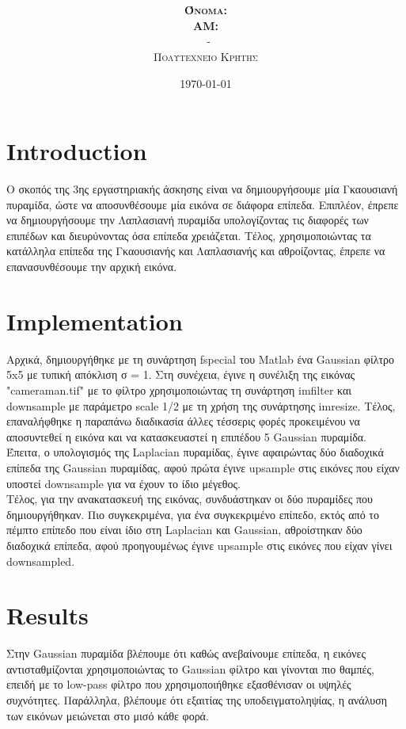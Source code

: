 \documentclass{article}
\title{\underline{\textbf{\assignmentNumber}}}
\author{\textsc{\textbf{Όνομα:}}  \studentName\\
		\textsc{\textbf{ΑΜ:}}  \studentNumber\\
		\course \ - \courseName\\ 
		\textsc{Πολυτεχνείο Κρήτης}
}
\date{\today}
\begin{document}
	\maketitle

\section*{Introduction}
	Ο σκοπός της 3ης εργαστηριακής άσκησης είναι να δημιουργήσουμε μία Γκαουσιανή πυραμίδα, ώστε να αποσυνθέσουμε μία εικόνα σε διάφορα επίπεδα. Επιπλέον, έπρεπε να δημιουργήσουμε την Λαπλασιανή πυραμίδα υπολογίζοντας τις διαφορές των επιπέδων και διευρύνοντας όσα επίπεδα χρειάζεται. Τέλος, χρησιμοποιώντας τα κατάλληλα επίπεδα της Γκαουσιανής και Λαπλασιανής και αθροίζοντας, έπρεπε να επανασυνθέσουμε την αρχική εικόνα.

\section*{Implementation}
	Αρχικά, δημιουργήθηκε με τη συνάρτηση fspecial του Matlab ένα Gaussian φίλτρο 5x5 με τυπική απόκλιση σ = 1. Στη συνέχεια, έγινε η συνέλιξη της εικόνας "cameraman.tif" με το φίλτρο χρησιμοποιώντας τη συνάρτηση imfilter και downsample με παράμετρο scale 1/2 με τη χρήση της συνάρτησης imresize. Τέλος, επαναλήφθηκε η παραπάνω διαδικασία άλλες τέσσερις φορές προκειμένου να αποσυντεθεί η εικόνα και να κατασκευαστεί η επιπέδου 5 Gaussian πυραμίδα.\\
	
	\noindent
	Έπειτα, ο υπολογισμός της Laplacian πυραμίδας, έγινε αφαιρώντας δύο διαδοχικά επίπεδα της Gaussian πυραμίδας, αφού πρώτα έγινε upsample στις εικόνες που είχαν υποστεί downsample για να έχουν το ίδιο μέγεθος.\\
	
	\noindent
	Τέλος, για την ανακατασκευή της εικόνας, συνδυάστηκαν οι δύο πυραμίδες που δημιουργήθηκαν. Πιο συγκεκριμένα, για ένα συγκεκριμένο επίπεδο, εκτός από το πέμπτο επίπεδο που είναι ίδιο στη Laplacian και Gaussian, αθροίστηκαν δύο διαδοχικά επίπεδα, αφού προηγουμένως έγινε upsample στις εικόνες που είχαν γίνει downsampled. \\
	
\section*{Results}
	Στην Gaussian πυραμίδα βλέπουμε ότι καθώς ανεβαίνουμε επίπεδα, η εικόνες αντισταθμίζονται χρησιμοποιώντας το Gaussian φίλτρο και γίνονται πιο θαμπές, επειδή με το low-pass φίλτρο που χρησιμοποιήθηκε εξασθένισαν οι υψηλές συχνότητες. Παράλληλα, βλέπουμε ότι εξαιτίας της υποδειγματοληψίας, η ανάλυση των εικόνων μειώνεται στο μισό κάθε φορά. \\
	
\end{document}
